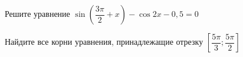 \begin{ex}
	\begin{condition}
		\begin{enumcols}[label=\asbuk*)]
			\item Решите уравнение \( \sin{\left(\dfrac{3\pi}{2}+x\right)}  - \cos 2x - 0,5= 0 \)
			\item Найдите все корни уравнения, принадлежащие отрезку \( \left[\dfrac{5\pi}{3};\dfrac{5\pi}{2}\right]  \)
		\end{enumcols}
	\end{condition}
\end{ex}